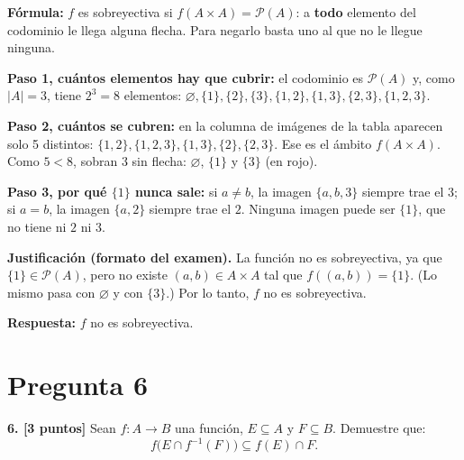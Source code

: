 \documentclass[11pt]{article}
\begin{document}
\begin{explica}
\textbf{Fórmula:} $f$ es sobreyectiva si $f(A\times A)=\mathcal P(A)$: a \textbf{todo} elemento del codominio le llega alguna flecha. Para negarlo basta uno al que no le llegue ninguna.

\textbf{Paso 1, cuántos elementos hay que cubrir:} el codominio es $\mathcal P(A)$ y, como $|A|=3$, tiene $2^3=8$ elementos: $\varnothing,\{1\},\{2\},\{3\},\{1,2\},\{1,3\},\{2,3\},\{1,2,3\}$.

\textbf{Paso 2, cuántos se cubren:} en la columna de imágenes de la tabla aparecen solo 5 distintos: $\{1,2\},\{1,2,3\},\{1,3\},\{2\},\{2,3\}$. Ese es el ámbito $f(A\times A)$. Como $5<8$, sobran 3 sin flecha: $\varnothing$, $\{1\}$ y $\{3\}$ (en rojo).

\textbf{Paso 3, por qué $\{1\}$ nunca sale:} si $a\neq b$, la imagen $\{a,b,3\}$ siempre trae el $3$; si $a=b$, la imagen $\{a,2\}$ siempre trae el $2$. Ninguna imagen puede ser $\{1\}$, que no tiene ni $2$ ni $3$.
\end{explica}

\textbf{Justificación (formato del examen).} La función no es sobreyectiva, ya que $\{1\}\in\mathcal P(A)$, pero no existe $(a,b)\in A\times A$ tal que $f((a,b))=\{1\}$. (Lo mismo pasa con $\varnothing$ y con $\{3\}$.) Por lo tanto, $f$ no es sobreyectiva.

\textbf{Respuesta:} $f$ no es sobreyectiva.

\clearpage
\section*{Pregunta 6}

\textbf{6. [3 puntos]} Sean $f:A\to B$ una función, $E\subseteq A$ y $F\subseteq B$. Demuestre que:
\[
f\big(E\cap f^{-1}(F)\big)\subseteq f(E)\cap F.
\]
\end{document}
